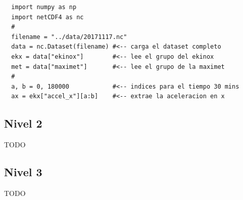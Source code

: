 \documentclass[11pt]{article}
\begin{document}
\begin{verbatim}
  import numpy as np
  import netCDF4 as nc
  #
  filename = "../data/20171117.nc" 
  data = nc.Dataset(filename) #<-- carga el dataset completo
  ekx = data["ekinox"]        #<-- lee el grupo del ekinox
  met = data["maximet"]       #<-- lee el grupo de la maximet
  #
  a, b = 0, 180000            #<-- indices para el tiempo 30 mins
  ax = ekx["accel_x"][a:b]    #<-- extrae la aceleracion en x
\end{verbatim}




\subsection{Nivel 2}
\label{sub:nivel_2}
TODO

\subsection{Nivel 3}
\label{sub:nivel_3}
TODO


\end{document}
